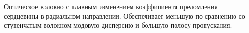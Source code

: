 Оптическое волокно с плавным изменением коэффициента
преломления сердцевины в радиальном направлении.
Обеспечивает меньшую по сравнению со ступенчатым
волокном модовую дисперсию и большую полосу пропускания.